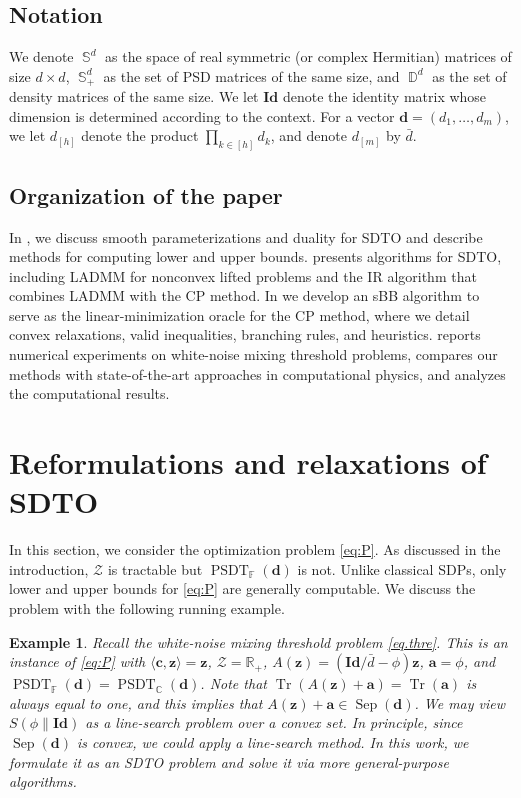 \documentclass[smallextended]{svjour3}
\newtheorem{example}{Example}
\newcommand{\R}{\mathbb R}
\newcommand{\F}{\mathbb F}
\newcommand{\C}{\mathbb C}
\newcommand{\cZ}{\mathcal Z}
\DeclareMathOperator{\sep}{Sep}
\DeclareMathOperator{\dmat}{\mathbb{D}}
\DeclareMathOperator{\SOST}{PSDT}
\newcommand{\1}{\mathbf{1}}
\newcommand{\z}{\mathbf{z}}
\newcommand{\bc}{\mathbf{c}}
\newcommand{\Id}{\mathbf{Id}}
\renewcommand{\a}{\mathbf{a}}
\DeclareMathOperator{\herm}{\mathbb{S}}
\DeclareMathOperator{\tr}{Tr}
\newcommand{\inner}[2]{\langle #1, #2 \rangle}
\newcommand{\vc}[1]{\mathbf{#1}}
\newcommand{\vd}{\vc{d}}
\begin{document}
\subsection{Notation}
We denote $\herm^d$ as the space of real symmetric (or complex Hermitian) matrices of size $d \times d$, $\herm^d_+$ as the set of PSD matrices of the same size, and $\dmat^d$ as the set of density matrices of the same size. We let $\Id$ denote the identity matrix whose dimension is determined according to the context. For a vector $\vd =(d_1,\dots,d_m)$, we let $d_{[h]}$ denote the product $\prod_{k \in[h]}d_k$, and denote $d_{[m]}$ by $\bar{d}$.


\subsection{Organization of the paper}
In , we discuss smooth parameterizations and duality for SDTO and describe methods for computing lower and upper bounds.  presents algorithms for SDTO, including LADMM for nonconvex lifted problems and the IR algorithm that combines LADMM with the CP method. In  we develop an sBB algorithm to serve as the linear-minimization oracle for the CP method, where we detail convex relaxations, valid inequalities, branching rules, and heuristics.  reports numerical experiments on white-noise mixing threshold problems, compares our methods with state-of-the-art  approaches in computational physics, and analyzes the computational results.


\section{Reformulations and relaxations of SDTO}
\label{sec.approx}
In this section, we consider the optimization problem \eqref{eq:P}. As discussed in the introduction, $\cZ$ is tractable but $\SOST_{\F}(\vd)$ is not. Unlike classical SDPs, only lower and upper bounds for \eqref{eq:P} are generally computable. We discuss the problem with the following running example.

\begin{example}
    \label{exp.ref1}
    Recall the white-noise mixing threshold problem \eqref{eq.thre}.
    This is an instance of \eqref{eq:P} with $\inner{\bc}{\z} = \z$, $\cZ = \R_+$, $A(\z) = (\Id / \bar{d}-\phi )\z$, $\a = \phi$, and $\SOST_{\F}(\vd) = \SOST_{\C}(\vd)$. Note that $\tr(A(\z) + \a) = \tr(\a)$ is always equal to one, and this implies that $A(\z) + \a \in \sep(\vd)$. We may view $S(\phi\|\Id)$ as a line-search problem over a convex set. In principle, since $\sep(\vd)$ is convex, we could apply a line-search method. In this work, we formulate it as an SDTO problem and solve it via more general-purpose algorithms.
\end{example}
\end{document}
